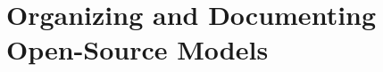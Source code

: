 \documentclass[11pt, oneside]{amsart}
\DeclareRobustCommand{\csdms}{\textsc{csdms}}
\begin{document}

\section{Organizing and Documenting Open-Source Models}
\label{sec:organizing}
\end{document}
